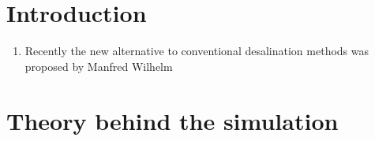 \documentclass{elsarticle}
\begin{document}
	\begin{frontmatter}{}


\title{\mytitle}



    \author[cuni,imc]{Michail Laktionov}
    \author[cuni]{Oleg V. Rud}
    \author[cuni]{Lucie~Nova}
    \author[cuni]{Filip~Uhlik}


    \address[cuni]{Department of Physical and Macromolecular Chemistry, Faculty of Science, Charles University in Prague, Hlavova 8, Praha 2 128 00, Czech Republic}
    \address[imc]{Institute of Macromolecular Compounds of Russian Academy of Sciences, 199004, Bolshoy pr. 31, Saint-Petersburg, Russia}




\begin{abstract}
By this article we model compression of \PE{} hydrogel in equilibrium with small volume of salty aqueous solution.
We show that the the change of the hydrogel volume affects the salinity of the solution. The decrease of the gel volume decreases the solution and vice versa the swelling of the gel increases the surrounding solution. 
This effect can be employed for water desalination ...
\end{abstract}

\end{frontmatter}{}
\section{Introduction\label{sec: theory}}
\begin{enumerate}
\item Recently the new alternative to conventional desalination methods was proposed by Manfred Wilhelm \cite{Arens}
\end{enumerate}

\section{Theory behind the simulation\label{sec: theory}}
\end{document}
